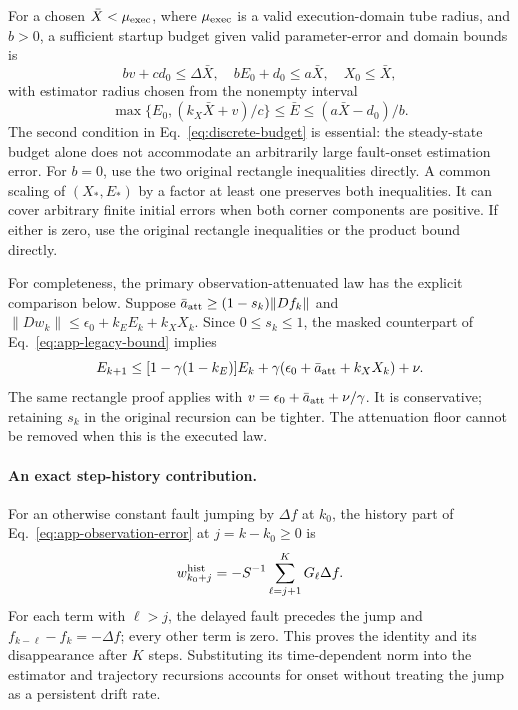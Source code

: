 For a chosen $\bar X<\mu_{\rm exec}$, where $\mu_{\rm exec}$ is a
valid execution-domain tube radius, and $b>0$, a sufficient startup budget
given valid parameter-error and domain bounds is
\begin{equation}
bv+c d_0\le\Delta\bar X,
\quad bE_0+d_0\le a\bar X,\quad X_0\le\bar X,
\label{eq:discrete-budget}
\end{equation}
with estimator radius chosen from the nonempty interval
\begin{equation}
\max\{E_0,(k_X\bar X+v)/c\}\le\bar E\le(a\bar X-d_0)/b.
\label{eq:discrete-radius-choice}
\end{equation}
The second condition in Eq.~\eqref{eq:discrete-budget} is essential:
the steady-state budget alone does not accommodate an arbitrarily large
fault-onset estimation error. For $b=0$, use the two original rectangle
inequalities directly. A common scaling of $(X_*,E_*)$ by a factor at least
one preserves both inequalities. It can cover arbitrary finite initial errors
when both corner components are positive. If either is zero, use the original
rectangle inequalities or the product bound directly.

For completeness, the primary observation-attenuated law has the explicit
comparison below. Suppose
$\bar a_{\rm att}\ge(1-s_k)\|Df_k\|$ and
$\|Dw_k\|\le\epsilon_0+k_EE_k+k_XX_k$. Since $0\le s_k\le1$,
the masked counterpart of Eq.~\eqref{eq:app-legacy-bound} implies
\begin{equation}
E_{k+1}\le[1-\gamma(1-k_E)]E_k+
\gamma(\epsilon_0+\bar a_{\rm att}+k_XX_k)+\nu.
\label{eq:discrete-legacy-region}
\end{equation}
The same rectangle proof applies with
$v=\epsilon_0+\bar a_{\rm att}+\nu/\gamma$.
It is conservative; retaining $s_k$ in the original recursion can be
tighter. The attenuation floor cannot be removed when this is the executed law.

\paragraph{An exact step-history contribution.}
For an otherwise constant fault jumping by $\Delta f$ at $k_0$, the
history part of Eq.~\eqref{eq:app-observation-error} at $j=k-k_0\ge0$ is
\begin{equation}
w_{k_0+j}^{\rm hist}=-S^{-1}\sum_{\ell=j+1}^{K}G_\ell\Delta f.
\label{eq:discrete-onset}
\end{equation}
For each term with $\ell>j$, the delayed fault precedes the jump and
$f_{k-\ell}-f_k=-\Delta f$; every other term is zero. This proves the
identity and its disappearance after $K$ steps. Substituting its time-dependent
norm into the estimator and trajectory recursions accounts for onset without
treating the jump as a persistent drift rate.

